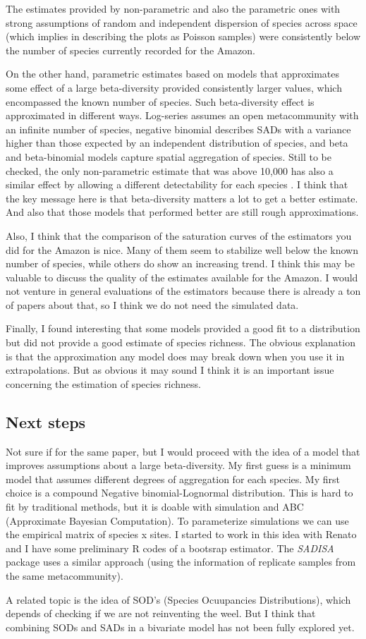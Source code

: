 \documentclass[12pt, A4]{article}\usepackage[]{graphicx}\usepackage[]{color}
\begin{document}
The estimates provided by non-parametric and
also the parametric ones with strong assumptions of random and independent dispersion of species
across space (which implies in describing the plots as Poisson samples) were
consistently below the number of species currently recorded for the Amazon.

On the other hand, parametric estimates based on models that
approximates some  effect of a large beta-diversity 
provided consistently larger
values, which encompassed the known number of species. 
Such beta-diversity effect is approximated in different ways.
Log-series assumes an open metacommunity with an infinite number of species,
negative binomial describes SADs with a variance higher than those expected
by an independent distribution of species, and beta and beta-binomial models
capture spatial aggregation of species. Still to be checked,
the only non-parametric estimate that was above 10,000 has also a similar 
effect by allowing a different detectability for each species \citep{wang2005}.
I think that the key message here 
is that beta-diversity matters a lot to get a better estimate. And also
that those models that performed better are still rough approximations.

Also, I think that the comparison of the saturation curves of the estimators you did 
for the Amazon is nice. 
Many of them seem to stabilize well below the known number of species, 
while others do show an increasing trend. I think this may be valuable
to discuss the quality of the estimates available for the Amazon. 
I would not venture in general evaluations of the estimators because
there is already a ton of papers about that, so I think we do not
need the simulated data.

Finally, I found interesting that
some models provided a good fit
to a distribution but did not provide a good estimate of species richness.
The obvious explanation is that the approximation any model does
may break down when you use it in extrapolations. But as obvious it may sound
I think it is an important issue concerning the estimation of species richness.


\subsection*{Next steps}

Not sure if for the same paper, but I would proceed with the idea of a model that improves
assumptions about a large beta-diversity. 
My first guess is a minimum model that assumes different degrees
of aggregation for each species. My first choice is a compound Negative binomial-Lognormal
distribution. This is hard to fit by traditional methods, but it is doable with 
simulation and ABC (Approximate Bayesian Computation). To parameterize simulations
we can use the empirical matrix of species x sites. 
I started to work in this idea with Renato and I have some preliminary R codes
of a bootsrap estimator. The \emph{SADISA} package uses a similar approach (using the information of 
replicate samples from the same metacommunity).

A related topic is the idea of SOD's (Species Ocuupancies Distributions),
which depends of checking if we are not reinventing the weel. But I think
that combining SODs and SADs in a bivariate model has not been fully explored
yet.


\end{document}
